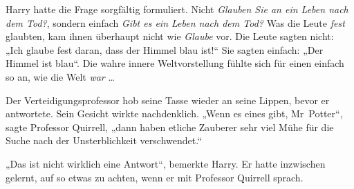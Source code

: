 Harry hatte die Frage sorgfältig formuliert. Nicht \emph{Glauben Sie an ein Leben nach dem Tod?}, sondern einfach \emph{Gibt es ein Leben nach dem Tod?} Was die Leute \emph{fest} glaubten, kam ihnen überhaupt nicht wie \emph{Glaube} vor. Die Leute sagten nicht:
„Ich glaube fest daran, dass der Himmel blau ist!“ Sie sagten einfach:
„Der Himmel ist blau“. Die wahre innere Weltvorstellung fühlte sich für einen einfach so an, wie die Welt \emph{war} …

Der Verteidigungsprofessor hob seine Tasse wieder an seine Lippen, bevor er antwortete. Sein Gesicht wirkte nachdenklich.
„Wenn es eines gibt, Mr~Potter“, sagte Professor Quirrell, „dann haben etliche Zauberer sehr viel Mühe für die Suche nach der Unsterblichkeit verschwendet.“

„Das ist nicht wirklich eine Antwort“, bemerkte Harry. Er hatte inzwischen gelernt, auf so etwas zu achten, wenn er mit Professor Quirrell sprach.

